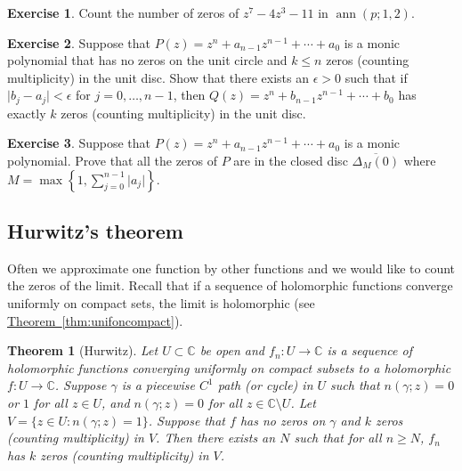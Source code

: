 \documentclass[12pt,openany]{book}
\newcommand{\ann}{\operatorname{ann}}
\newcommand{\sabs}[1]{\lvert {#1} \rvert}
\newcommand{\C}{{\mathbb{C}}}
\theoremstyle{plain}
\newtheorem{thm}{Theorem}[section]
\theoremstyle{remark}
\theoremstyle{definition}
\newenvironment{exbox}{%
    \def\FrameCommand{\vrule width 1pt \relax\hspace{10pt}}%
    \MakeFramed{\advance\hsize-\width\FrameRestore}%
}{%
    \endMakeFramed
}
\theoremstyle{exercise}
\newtheorem{exercise}{Exercise}[section]
\theoremstyle{example}
\newcommand{\thmref}[1]{\hyperref[#1]{Theorem~\ref*{#1}}}
\begin{document}
\begin{exbox}
\begin{exercise}
Count the number of zeros of $z^7-4z^3-11$ in $\ann(p;1,2)$.
\end{exercise}

\begin{exercise}
Suppose that
$P(z) = z^n + a_{n-1} z^{n-1} + \cdots + a_0$
is a monic polynomial that has no zeros on the unit circle and $k \leq n$ zeros
(counting multiplicity)
in the unit disc.  Show that there exists an $\epsilon > 0$ such that
if $\sabs{b_j-a_j} < \epsilon$ for $j=0,\ldots,n-1$, then
$Q(z) = z^n + b_{n-1} z^{n-1} + \cdots + b_0$ has
exactly $k$ zeros (counting multiplicity) in the unit disc.
\end{exercise}

\begin{exercise}
Suppose that
$P(z) = z^n + a_{n-1} z^{n-1} + \cdots + a_0$
is a monic polynomial.  Prove that all the zeros of $P$ are
in the closed disc $\overline{\Delta_M(0)}$ where $M =
\max\left\{ 1, \sum_{j=0}^{n-1} \sabs{a_j} \right\}$.
\end{exercise}
\end{exbox}

\subsection{Hurwitz's theorem}

Often we approximate one function by other functions and we would like to
count the zeros of the limit.  Recall that if a sequence of holomorphic
functions converge uniformly on compact sets, the limit is holomorphic
(see \thmref{thm:unifoncompact}).

\begin{thm}[Hurwitz]
Let $U \subset \C$ be open and $f_n \colon U \to \C$ is a sequence of
holomorphic functions converging uniformly on compact subsets
to a holomorphic $f \colon U \to \C$.  Suppose $\gamma$ is a piecewise $C^1$
path (or cycle) in $U$ such that $n(\gamma;z) = 0$ or $1$ for all $z \in U$,
and $n(\gamma;z) = 0$ for all $z \in \C \setminus U$.  Let
$V = \{ z \in U : n(\gamma;z) = 1 \}$.
Suppose that $f$ has no zeros on $\gamma$ and $k$ zeros (counting
multiplicity) in $V$.
Then there exists an $N$ such that for all $n \geq N$,
$f_n$ has $k$ zeros (counting multiplicity) in $V$.
\end{thm}
\end{document}
